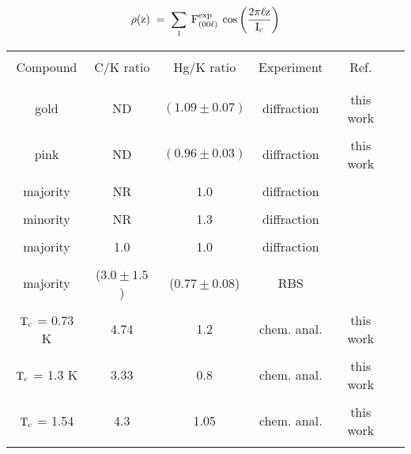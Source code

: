 {\newpage
\clearpage
\samepage \begin{equation}\label{denscalc}
\rm \rho(z) \; = \; \sum_l \: F^{exp}_{(00\ell)} \: \cos \left( \frac{2\pi
\ell z}{I_c} \right)
\end{equation}
}

{\newpage
\clearpage
\samepage \begin{figure}\vspace{19cm}

\label{rhofig}
\end{figure}
}

{\newpage
\clearpage
\samepage \begin{table}
\label{stoichtab}
\begin{center}
\begin{tabular}{|c|ccccc|}
\hline
& & & & \\ 
Compound & C/K ratio & Hg/K ratio & Experiment & Ref.\\ 
& & & & \\ 
\hline
& & & & \\ 
gold  & ND & $(1.09 \pm 0.07)$ & diffraction  & this work\\ 
& & & & \\ 
pink  & ND & $(0.96 \pm 0.03)$ &  diffraction  & this work \\ 
& & & & \\ 
majority  & NR & 1.0 & diffraction  & \cite{yang84}\\ 
& & & & \\ 
minority  & NR & 1.3 &  diffraction  & \cite{yang84} \\ 
& & & & \\ 
majority  & 1.0 & 1.0 &  diffraction  & \cite{elmakrini80}\\ 
& & & & \\ 
majority  & ($3.0 \pm 1.5$) & ($0.77 \pm 0.08$) & RBS &  \cite{S175}\\ 
& & & & \\ 
$\rm T_c$ = 0.73 K  & 4.74 & 1.2 & chem. anal. & this work \\ 
& & & & \\ 
$\rm T_c$ = 1.3 K   & 3.33 & 0.8 & chem. anal. & this work\\ 
& & & & \\ 
$\rm T_c$ = 1.54  & 4.3 & 1.05 & chem. anal. & this work \\ 
& & & & \\ 
\hline
\end{tabular}
\end{center}
\end{table}
}

